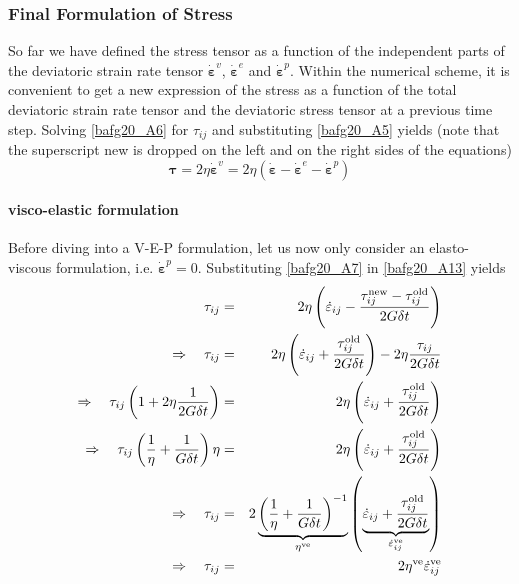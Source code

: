 \subsubsection{Final Formulation of Stress}

So far we have defined the stress tensor as a function of the independent parts 
of the deviatoric strain rate tensor 
$\dot {\bm \varepsilon}^{v}$, $\dot {\bm \varepsilon}^{e}$ and $\dot {\bm \varepsilon}^{p}$.
Within the numerical scheme, it is convenient to get a new expression of the stress as
a function of the total deviatoric strain rate tensor and the deviatoric stress tensor at a previous time step.
Solving \eqref{bafg20_A6} for $\tau_{ij}$ and substituting \eqref{bafg20_A5} yields 
(note that the superscript new is dropped on the left and on the right sides of the equations)
\begin{equation}
{\bm \tau} 
= 2\eta \dot {\bm \varepsilon}^{v} = 
2\eta ( \dot {\bm \varepsilon} - \dot {\bm \varepsilon}^{e} - \dot {\bm \varepsilon}^{p})
\label{bafg20_A13}
\end{equation}


\paragraph{visco-elastic formulation}
Before diving into a V-E-P formulation, let us now only consider an elasto-viscous
formulation, i.e. $\dot{\bm \varepsilon}^p = 0$.
Substituting \eqref{bafg20_A7} in \eqref{bafg20_A13} yields
\begin{eqnarray}
\tau_{ij} &=& 
2\eta \left( \dot { \varepsilon}_{ij} - 
\frac{ {\tau}_{ij}^{\rm new} - {\tau}_{ij}^{\rm old}  }{2 G \delta t} \right)
\nonumber\\
\Rightarrow \quad 
\tau_{ij} &=& 
2\eta \left( \dot { \varepsilon}_{ij} 
+ \frac{   {\tau}_{ij}^{\rm old}  }{2 G \delta t}
\right)
- 2\eta 
\frac{ {\tau}_{ij} }{2 G \delta t} \nonumber\\
\Rightarrow \quad 
\tau_{ij} \left( 1 +2\eta   \frac{ 1 }{2 G \delta t} \right)
&=& 
2\eta \left( \dot { \varepsilon}_{ij} 
+ \frac{   {\tau}_{ij}^{\rm old}  }{2 G \delta t}
\right) \nonumber\\
\Rightarrow \quad 
\tau_{ij} \left( \frac{1}{\eta} +   \frac{ 1 }{ G \delta t} \right) \eta
&=& 
2\eta \left( \dot { \varepsilon}_{ij} 
+ \frac{   {\tau}_{ij}^{\rm old}  }{2 G \delta t}
 \right)
\nonumber\\
\Rightarrow \quad 
\tau_{ij} &=& 2
\underbrace{ \left( \frac{1}{\eta} +   \frac{ 1 }{ G \delta t} \right)^{-1} }_{\eta^{\rm ve} }
\left( 
\underbrace{ \dot { \varepsilon}_{ij}  + \frac{   {\tau}_{ij}^{\rm old}  }{2 G \delta t} }_{ \dot{\varepsilon}_{ij}^{\rm ve} }
\right) \nonumber\\
\Rightarrow \quad 
\tau_{ij} &=& 2 \eta^{\rm ve} \dot{\varepsilon}_{ij}^{\rm ve} 
\end{eqnarray}

